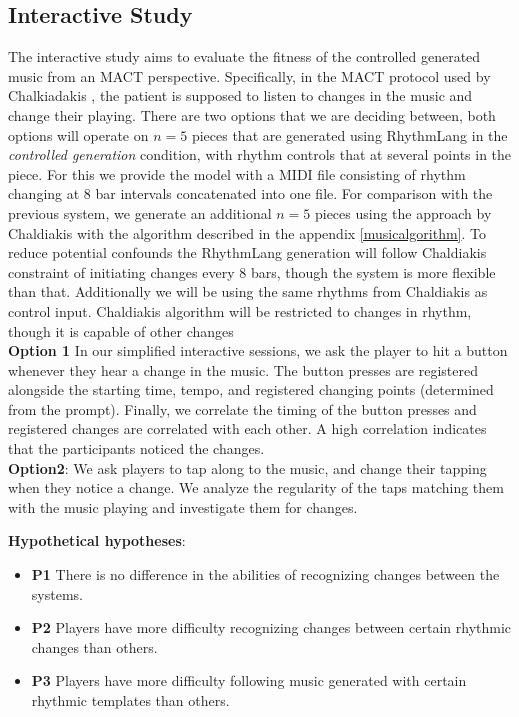 \subsection{Interactive Study}
The interactive study aims to evaluate the fitness of the controlled generated music from an MACT perspective. Specifically, in the MACT protocol used by Chalkiadakis \cite{Chalkiadakis_2022}, the patient is supposed to listen to changes in the music and change their playing. There are two options that we are deciding between, both options will operate on $n=5$ pieces that are generated using RhythmLang in the \textit{controlled generation} condition, with rhythm controls that at several points in the piece. For this we provide the model with a MIDI file consisting of rhythm changing at 8 bar intervals concatenated into one file.
For comparison with the previous system, we generate an additional $n=5$ pieces using the approach by Chaldiakis\cite{Chalkiadakis_2022} with the algorithm described in the appendix \ref{musicalgorithm}. To reduce potential confounds the RhythmLang generation will follow Chaldiakis constraint of initiating changes every 8 bars, though the system is more flexible than that. Additionally we will be using the same rhythms from Chaldiakis as control input. Chaldiakis algorithm will be restricted to changes in rhythm, though it is capable of other changes\\
\textbf{Option 1}
In our simplified interactive sessions, we ask the player to hit a button whenever they hear a change in the music. The button presses are registered alongside the starting time, tempo, and registered changing points (determined from the prompt). Finally, we correlate the timing of the button presses and registered changes are correlated with each other. A high correlation indicates that the participants noticed the changes. \\

\textbf{Option2}: We ask players to tap along to the music, and change their tapping when they notice a change. We analyze the regularity of the taps matching them with the music playing and investigate them for changes. 

\textbf{Hypothetical hypotheses}: 
\begin{itemize}
    \item \textbf{P1} There is no difference in the abilities of recognizing changes between the systems.
    \item \textbf{P2} Players have more difficulty recognizing changes between certain rhythmic changes than others.
    \item \textbf{P3} Players have more difficulty following music generated with certain rhythmic templates than others.     
\end{itemize}

